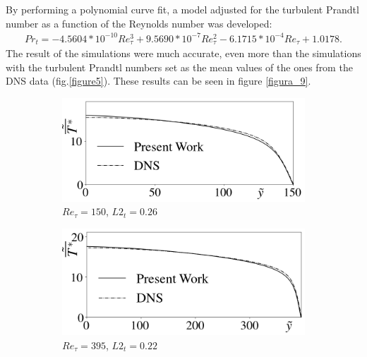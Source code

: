 \documentclass[10pt]{article} %
\begin{document}
By performing a polynomial curve fit, a model adjusted for the turbulent Prandtl number as a function of the Reynolds number was developed:
\begin{equation}
\begin{split}
Pr_t = -4.5604 * 10^{-10} Re_\tau^3 + 9.5690 * 10^{-7} Re_\tau^2 - 6.1715 *10 ^{-4} Re_\tau + 1.0178 .
\end{split}
\end{equation}
The result of the simulations were much accurate, even more than the simulations with the turbulent Prandtl numbers set as the mean values of the ones from the DNS data (fig.\ref{figure5}). These results can be seen in figure \ref{figura_9}.



\begin{figure}[!h]
	\centering
	\begin{subfigure}[t]{0.5\textwidth}
		\centering
		\includegraphics[angle=0, scale=0.24]{fotos_formatacao_final/Temperature_150_071_Prt(Ret)_A26}
		\caption{$Re_\tau = 150$, $L2_t = 0.26$}
	\end{subfigure}
	\begin{subfigure}[t]{0.45\textwidth}
		\centering
		\includegraphics[angle=0, scale=0.24]{fotos_formatacao_final/Temperature_395_071_Prt(Ret)_A26}
		\caption{$Re_\tau = 395$, $L2_t = 0.22$}
	\end{subfigure}
	\begin{subfigure}[t]{0.5\textwidth}

\end{subfigure}
\end{figure}
\end{document}
